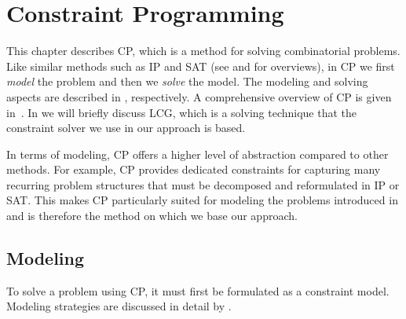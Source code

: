%

\chapter{Constraint Programming}


This chapter describes \gls{CP}, which is a method for solving combinatorial
problems.
%
Like similar methods such as \gls{IP} and \gls{SAT} (see \cite{Wolsey:1998} and
\cite{BiereEtAl:2009} for overviews), in \gls{CP} we first \emph{model} the
problem and then we \emph{solve} the model.
%
The modeling and solving aspects are described in , respectively.
%
A comprehensive overview of \gls{CP} is given in~\cite{RossiEtAl:2006}.
%
In  we will briefly discuss \glsdesc{LCG},
which is a solving technique that the \gls{constraint solver} we use in our
approach is based.

In terms of modeling, \gls{CP} offers a higher level of abstraction compared to
other methods.
%
For example, \gls{CP} provides dedicated \glspl{constraint} for capturing many
recurring problem structures that must be decomposed and reformulated in
\gls{IP} or \gls{SAT}.
%
This makes \gls{CP} particularly suited for modeling the problems introduced in
 and is therefore the method on which we base our
approach.


\section{Modeling}

To solve a problem using \gls{CP}, it must first be formulated as a
\gls{constraint model}.
%
Modeling strategies are discussed in detail by \textcite{Smith:2006}.

